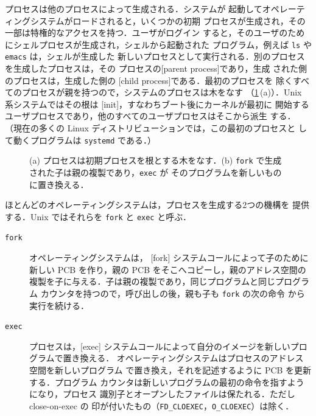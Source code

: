 \documentclass[../main.tex]{subfiles}
\begin{document}
プロセスは他のプロセスによって生成される．システムが
起動してオペレーティングシステムがロードされると，いくつかの初期
プロセスが生成され，その一部は特権的なアクセスを持つ．ユーザがログイン
すると，そのユーザのためにシェルプロセスが生成され，シェルから起動された
プログラム，例えば \texttt{ls} や \texttt{emacs} は，シェルが生成した
新しいプロセスとして実行される．別のプロセスを生成したプロセスは，その
プロセスの[parent process]であり，生成
された側のプロセスは，生成した側の
[child process]である．最初のプロセスを
除くすべてのプロセスが親を持つので，システムのプロセスは木をなす
（\cref{fig:l02-creation}\,(a)）．Unix 系システムではその根は
[init]，すなわちブート後にカーネルが最初に
開始するユーザプロセスであり，他のすべてのユーザプロセスはそこから派生
する．
（現在の多くの Linux ディストリビューションでは，この最初のプロセスと
して動くプログラムは \texttt{systemd} である．）%

\begin{figure}[htbp]
  \centering
  
  \caption{(a) プロセスは初期プロセスを根とする木をなす．(b)
    \texttt{fork} で生成された子は親の複製であり，\texttt{exec} が
    そのプログラムを新しいものに置き換える．}
  \label{fig:l02-creation}
\end{figure}

ほとんどのオペレーティングシステムは，プロセスを生成する2つの機構を
提供する．Unix ではそれらを \texttt{fork} と \texttt{exec} と呼ぶ．
\begin{description}
  \item[\texttt{fork}] オペレーティングシステムは，
    [fork] システムコールによって子のために
    新しい PCB を作り，親の PCB をそこへコピーし，親のアドレス空間の
    複製を子に与える．子は親の複製であり，同じプログラムと同じプログラム
    カウンタを持つので，呼び出しの後，親も子も \texttt{fork} の次の命令
    から実行を続ける．
  \item[\texttt{exec}] プロセスは，[exec]
    システムコールによって自分のイメージを新しいプログラムで置き換える．
    オペレーティングシステムはプロセスのアドレス空間を新しいプログラム
    で置き換え，それを記述するように PCB を更新する．プログラム
    カウンタは新しいプログラムの最初の命令を指すようになり，プロセス
    識別子とオープンしたファイルは保たれる．ただし close-on-exec の
    印が付いたもの（\texttt{FD\_CLOEXEC}，\texttt{O\_CLOEXEC}）は除く．%
\end{description}
\end{document}
